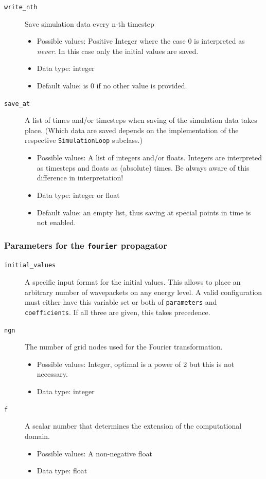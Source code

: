 \documentclass[a4paper,10pt]{report}
\begin{document}
\begin{description}
  \item[\texttt{write\_nth}] Save simulation data every n-th timestep
  \begin{itemize}
    \item Possible values: Positive Integer where the case 0 is interpreted as
          \emph{never}. In this case only the initial values are saved.
    \item Data type: integer
    \item Default value: is 0 if no other value is provided.
  \end{itemize}

  \item[\texttt{save\_at}] A list of times and/or timesteps when saving of the
    simulation data takes place. (Which data are saved depends on the implementation
    of the respective \texttt{SimulationLoop} subclass.)
  \begin{itemize}
    \item Possible values: A list of integers and/or floats. Integers are interpreted
    as timesteps and floats as (absolute) times. Be always aware of this difference
    in interpretation!
    \item Data type: integer or float
    \item Default value: an empty list, thus saving at special points in time
    is not enabled.
  \end{itemize}
\end{description}

\subsubsection{Parameters for the \texttt{fourier} propagator}

\begin{description}

  \item[\texttt{initial\_values}] A specific input format for the initial values.
    This allows to place an arbitrary number of wavepackets on any energy level.
    A valid configuration must either have this variable set or both of
    \texttt{parameters} and \texttt{coefficients}. If all three are given, this
    takes precedence.

  \item[\texttt{ngn}] The number of grid nodes used for the Fourier transformation.
  \begin{itemize}
    \item Possible values: Integer, optimal is a power of 2 but this is not necessary.
    \item Data type: integer
  \end{itemize}

  \item[\texttt{f}] A scalar number that determines the extension of the computational domain.
  \begin{itemize}
    \item Possible values: A non-negative float
    \item Data type: float
  \end{itemize}
\end{description}
\end{document}
